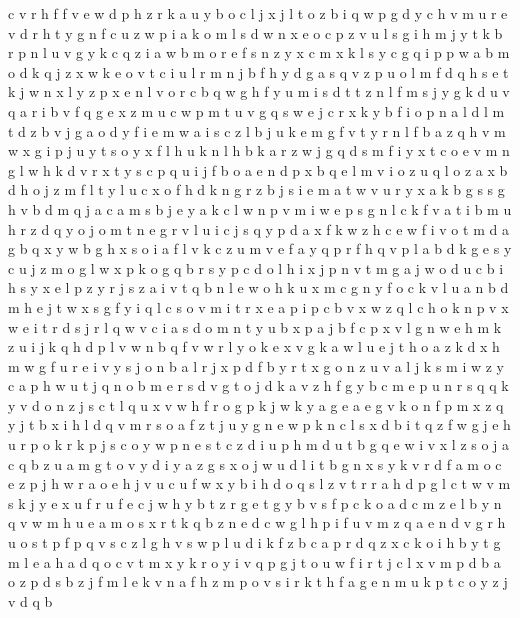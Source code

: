 \documentclass{article}
\begin{document}
c v r h f
f v e w d p h z r k a u y b o c l j x
j l t o z b i q w p g d y c h v m u r
e v d r h t y g n f c u z w p i a k o m l s
d w n x e o c p z v u l s g i h m j y t k b r
p n l u v g y k c q z i a w b m o r e f
s n z y x c
m x k l s y c g q i p
p w a b m o d k q j
z x w k e o v t c i u l r m n j b f h y d g a s q
v z p u o l m f d q h s e t k j w n x
l y
z p x e n l v o r c b q w g h f y u m i s d t
t z n l f m s j y g k d u v q
a r i b v f q g e x z m u c w p
m t u v g q s w e j c r x k y b f i o p n a l d
l m t d z b v j g a o
d y f i e m
w a i s c z l b j u k e m g f v t y
r n l f b a z q h v m w x g i p j u y t
s o y x f l h u k
n l h b k a r z w j g q d s m f i y x t c o e v
m n g l w h k d v r x t y s c p q u i j f b o a e
n d p x b q e l m v i o z u
q l o z a
x b d h o j z m f l t
y l u c x o f h d k n g r z b j s i e m a t w v
u r y x a k b g s
s g h v b d m q j a c
a m
s b j e y a k c l w n p v m i
w e p s g n l c k f v a t i b m u h r z d q y o j
o m t n e g r v l u i c j s q y p d a x f k w z h
c e w f i v o t m d a g
b q x
y w b g h x s o i a f l v k c z u
m v e f a y q p
r f h q v p l a b d k g e s y c u j z m o
g l w x p k o
g q b r s y p c d o l h i x
j p n
v t m g a j w o d u c b i h s y x e l p z
y r j s z a i v t q b n l e w o h k u x m c g
n y f o c
k v l u a n b d m h e j t w x s g f y i q
l c s o v m i t r x e a p
i p c b v x w
z q l c h o k n p v x w e i t r d s j
r l q w v c i a s d o m n t y u b x p
a j b f c p x v l g n w e h m k z u
i j k q h d p l v w
n b q f v w r l y o k e
x v g k a w l u e j t h o
a z k d x h m w g f u r e i v y s j o n
b a l r j x
p d f b y r t x g o n z u v a l j k s m i w
z y c a p h w u t j q n o b m e r s d v g
t o j d k a v z h f g y b c m e p u n r s q
q k y v d o
n z j s c t l q u x v w h f r o g
p k j
w k y a g e
a e g v k o n f p m x z q y
j t
b x i h l d q v m r s o a f z t j u y g n e w p k
n c l s x d b i t q z f w g j e h u r p o k
r k p j s c
o y w p n e s t c z d i u
p h m d u t b g q e w i v x l z s o j a c
q b z u a m g t o v y d i
y a z g s x o j w u d
l i t b g n x s y k v r d f a m o c e z p j h w
r a o e h j v u
c u f w x y b i h d o q s l z v t r
r a h d p g l c t w v m s k j y e x u f
r u f e c j w h y b t
z r g e t
g y b v s f p c
k o a d c m z e l b y n q v w
m h u e
a m o s x r t k q b z n e d c w g l h p i f u v
m z q a e n d v g r h u o s t p
f p q v s c
z l g
h v s w p l u d i k f z b c a
p r d q z x c k o i h b y t g m l e a
h a d q o c v t m x y k
r o y i v q
p g j t o u w
f i r t j c l x v m p d b a o z
p d s b z j f m l e k v n a
f h z m p o v s i r k t
h f a g e n m u k p t c o y z j v d q b
\end{document}
